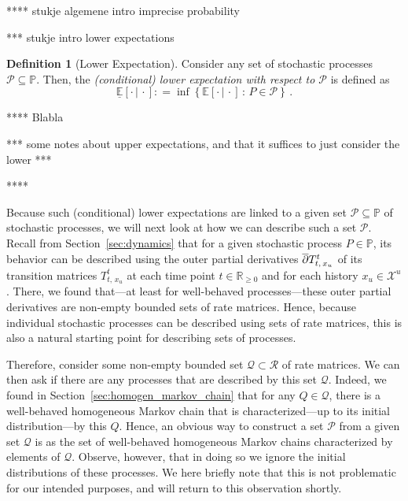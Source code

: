 \documentclass[10pt]{paper}
\theoremstyle{definition}
\newtheorem{definition}{Definition}
\newcommand{\reals}{\mathbb{R}}
\newcommand{\realsnonneg}{\reals_{\geq 0}}
\newcommand{\states}{\mathcal{X}}
\newcommand{\processes}{\mathbb{P}}
\newcommand{\whmprocesses}{\processes^{\mathrm{WHM}}}
\newcommand{\rateset}{\mathcal{Q}}
\newcommand{\coloneqq}{:\!=}
\begin{document}
**** stukje algemene intro imprecise probability

*** stukje intro lower expectations

\begin{definition}[Lower Expectation]\label{def:lower_exp}
Consider any set of stochastic processes $\mathcal{P}\subseteq\processes$. Then, the \emph{(conditional) lower expectation with respect to $\mathcal{P}$} is defined as
\begin{equation*}
\underline{\mathbb{E}}[\cdot\,\vert\,\cdot] \coloneqq \inf\left\{\mathbb{E}[\cdot\,\vert\,\cdot]\,:\,P\in\mathcal{P}\right\}\,.
\end{equation*}
\end{definition}

**** Blabla

*** some notes about upper expectations, and that it suffices to just consider the lower ***

****

Because such (conditional) lower expectations are linked to a given set $\mathcal{P}\subseteq\processes$ of stochastic processes, we will next look at how we can describe such a set $\mathcal{P}$.
Recall from Section~\ref{sec:dynamics} that for a given stochastic process $P\in\processes$, its behavior can be described using the outer partial derivatives $\smash{\overline{\partial}}T_{t,\,x_u}^t$ of its transition matrices $T_{t,\,x_u}^t$ at each time point $t\in\realsnonneg$ and for each history $x_u\in\states^u$. There, we found that---at least for well-behaved processes---these outer partial derivatives are non-empty bounded sets of rate matrices. Hence, because individual stochastic processes can be described using sets of rate matrices, this is also a natural starting point for describing sets of processes.

Therefore, consider some non-empty bounded set $\rateset\subset\mathcal{R}$ of rate matrices. We can then ask if there are any processes that are described by this set $\rateset$. Indeed, we found in Section~\ref{sec:homogen_markov_chain} that for any $Q\in\rateset$, there is a well-behaved homogeneous Markov chain that is characterized---up to its initial distribution---by this $Q$. Hence, an obvious way to construct a set $\mathcal{P}$ from a given set $\rateset$ is as the set of well-behaved homogeneous Markov chains characterized by elements of $\rateset$. Observe, however, that in doing so we ignore the initial distributions of these processes. %
We here briefly note that this is not problematic for our intended purposes, and will return to this observation shortly.
\end{document}
